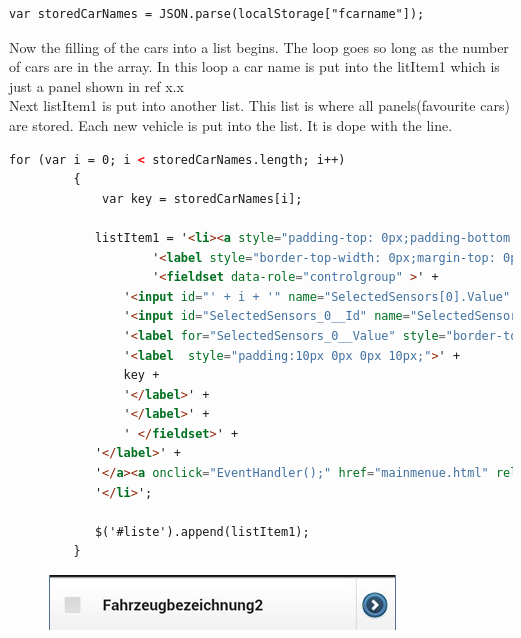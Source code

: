 \begin{lstlisting}[language=html, caption= 
start timer function,captionpos=b]
var storedCarNames = JSON.parse(localStorage["fcarname"]); 
\end{lstlisting}

Now the filling of the cars into a list begins. The loop goes so long as the number of cars are in the array. In this loop a car name is put into the litItem1 which is just a panel shown in ref x.x
\\

Next listItem1 is put into another list. This list is where all panels(favourite cars) are stored. Each new vehicle is put into the list. It is dope with the line.
\\
\begin{lstlisting}[language=html, caption= 
start timer function,captionpos=b]
for (var i = 0; i < storedCarNames.length; i++)  
         {
             var key = storedCarNames[i];

            listItem1 = '<li><a style="padding-top: 0px;padding-bottom: 0px;padding-right: 42px;padding-left: 0px;">' +
                    '<label style="border-top-width: 0px;margin-top: 0px;border-bottom-width: 0px;margin-bottom: 0px;border-left-width: 0px;border-right-width: 0px;" data-corners="false">' +
                    '<fieldset data-role="controlgroup" >' +
                '<input id="' + i + '" name="SelectedSensors[0].Value" type="checkbox" value="true" />' +
                '<input id="SelectedSensors_0__Id" name="SelectedSensors[0].Id" type="hidden" value="16" />' +
                '<label for="SelectedSensors_0__Value" style="border-top-width: 0px;margin-top: 0px;border-bottom-width: 0px;margin-bottom: 0px;border-left-width: 0px;border-right-width: 0px;">' +
                '<label  style="padding:10px 0px 0px 10px;">' +
                key +
                '</label>' +
                '</label>' +
                ' </fieldset>' +
            '</label>' +
            '</a><a onclick="EventHandler();" href="mainmenue.html" rel="external"></a>' +
            '</li>';

            $('#liste').append(listItem1);
         }
\end{lstlisting}

\begin{figure}[h]
\centering
\includegraphics[width=0.4\linewidth]{graphics/chapter4/16}
\caption{}
\label{fig:17}
\end{figure}

